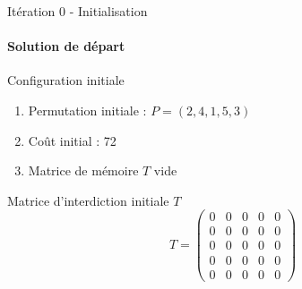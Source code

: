 \documentclass[10pt, handout]{beamer}
\begin{document}
\begin{frame}{Itération 0 - Initialisation}
    \framesubtitle{Solution de départ}

    \begin{block}{Configuration initiale}
        \begin{enumerate}
            \item Permutation initiale : \( P = (2, 4, 1, 5, 3) \)
            \item Coût initial : 72
            \item Matrice de mémoire \( T \) vide
        \end{enumerate}
    \end{block}

    \begin{exampleblock}{Matrice d'interdiction initiale \( T \)}
        \[
            T = \begin{pmatrix}
                0 & 0 & 0 & 0 & 0 \\
                0 & 0 & 0 & 0 & 0 \\
                0 & 0 & 0 & 0 & 0 \\
                0 & 0 & 0 & 0 & 0 \\
                0 & 0 & 0 & 0 & 0
            \end{pmatrix}
        \]
    \end{exampleblock}
\end{frame}
\end{document}
